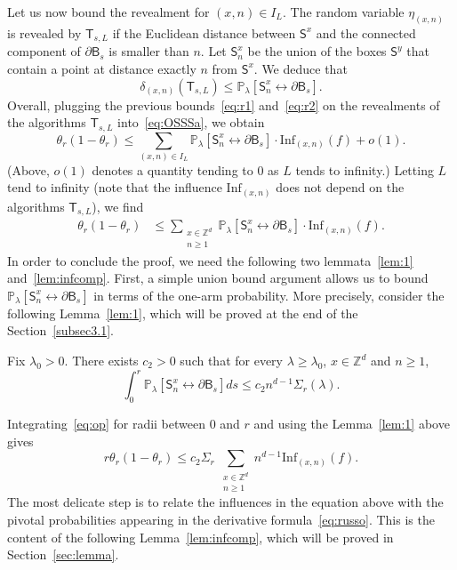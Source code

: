 \documentclass[AHL,Unicode,longabstracts]{cedram}
\newcommand{\infl}{\mathrm{Inf}}
\begin{document}
Let us now bound the revealment for $(x,n)\in I_L$. The random variable $\eta_{(x,n)}$ is revealed by $\mathsf T_{s,L}$ if the Euclidean distance between $\mathsf S^x$ and the connected component of $\partial \mathsf B_s$ is smaller than $n$. Let $\mathsf S^x_n$ be the union of the boxes $\mathsf S^y$ that contain a point at distance exactly $n$ from $\mathsf S^x$. We deduce that
\begin{equation}\label{eq:r2}
\delta_{(x,n)}(\mathsf T_{s,L})\le {\mathbb P}_\lambda[\mathsf S^x_n\stackrel{}{\longleftrightarrow}\partial\mathsf B_s].
\end{equation}
Overall, plugging the previous bounds~\eqref{eq:r1} and~\eqref{eq:r2} on the revealments of the algorithms $\mathsf T_{s,L}$ into~\eqref{eq:OSSSa}, we obtain
\[
\theta_{r}(1-\theta_{r}) \le \sum_{(x,n)\in I_L}{\mathbb P}_\lambda[\mathsf S^x_n\stackrel{}{\longleftrightarrow}\partial\mathsf B_s]\cdot \infl_{(x,n)}(f) +o(1).
\]
(Above, $o(1)$ denotes a quantity tending to $0$ as $L$ tends to infinity.) Letting $L$ tend to infinity (note that the influence $\infl_{(x,n)}$ does not depend on the algorithms $\mathsf T_{s,L}$), we find
\begin{align}\label{eq:op}
\theta_{r}(1-\theta_{r}) &\le \sum_{\substack{x\in {\mathbb Z}^d\\ n\ge1}}{\mathbb P}_\lambda[\mathsf S^x_n\stackrel{}{\longleftrightarrow}\partial\mathsf B_s]\cdot \infl_{(x,n)}(f).
\end{align}
In order to conclude the proof, we need the following two lemmata~\ref{lem:1} and~\ref{lem:infcomp}. First, a simple union bound argument allows us to bound ${\mathbb P}_\lambda[\mathsf S^x_n\stackrel{}{\longleftrightarrow}\partial\mathsf B_s]$ in terms of the one-arm probability. More precisely, consider the following Lemma~\ref{lem:1}, which will be proved at the end of the Section~\ref{subsec3.1}.

\begin{lemm}\label{lem:1}
Fix $\lambda_0>0$. There exists $c_2>0$ such that for every $\lambda\ge\lambda_0$, $x\in{\mathbb Z}^d$ and $n\ge1$,
\[
\int_0^r{\mathbb P}_\lambda[\mathsf S^x_n\stackrel{}{\longleftrightarrow}\partial\mathsf B_s]ds\le c_2 n^{d-1}\Sigma_r(\lambda).
\]
\end{lemm}

Integrating~\eqref{eq:op} for radii between 0 and $r$ and using the Lemma~\ref{lem:1} above gives
\begin{equation}\label{eq:4}
r\theta_{r}(1-\theta_{r}) \le c_2\Sigma_r\ \sum_{\substack{x\in {\mathbb Z}^d\\ n\ge1}} n^{d-1}\infl_{(x,n)}(f).
\end{equation}
The most delicate step is to relate the influences in the equation above with the pivotal probabilities appearing in the derivative formula~\eqref{eq:russo}. This is the content of the following Lemma~\ref{lem:infcomp}, which will be proved in Section~\ref{sec:lemma}.
\end{document}
